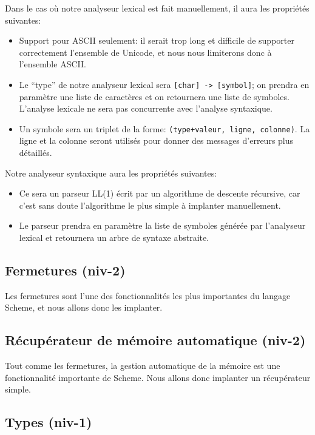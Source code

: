 \documentclass[11pt]{article}
\begin{document}
Dans le cas où notre analyseur lexical est fait manuellement, il aura
les propriétés suivantes:

\begin{itemize}
\item Support pour ASCII seulement: il serait trop long et difficile
  de supporter correctement l'ensemble de Unicode, et nous nous
  limiterons donc à l'ensemble ASCII.
\item Le ``type'' de notre analyseur lexical sera \texttt{[char] ->
    [symbol]}; on prendra en paramètre une liste de caractères et on
  retournera une liste de symboles.  L'analyse lexicale ne sera pas
  concurrente avec l'analyse syntaxique.
\item Un symbole sera un triplet de la forme: \texttt{(type+valeur,
    ligne, colonne)}.  La ligne et la colonne seront utilisés pour
  donner des messages d'erreurs plus détaillés.
\end{itemize}

Notre analyseur syntaxique aura les propriétés suivantes:

\begin{itemize}
\item Ce sera un parseur LL(1) écrit par un algorithme de descente
  récursive, car c'est sans doute l'algorithme le plus simple à
  implanter manuellement.
\item Le parseur prendra en paramètre la liste de symboles générée par
  l'analyseur lexical et retournera un arbre de syntaxe abstraite.
\end{itemize}



\subsection{Fermetures (niv-2)}

Les fermetures sont l'une des fonctionnalités les plus importantes du
langage Scheme, et nous allons donc les implanter.

\subsection{Récupérateur de mémoire automatique (niv-2)}

Tout comme les fermetures, la gestion automatique de la mémoire est
une fonctionnalité importante de Scheme.  Nous allons donc implanter
un récupérateur simple.

\subsection{Types (niv-1)}
\end{document}
